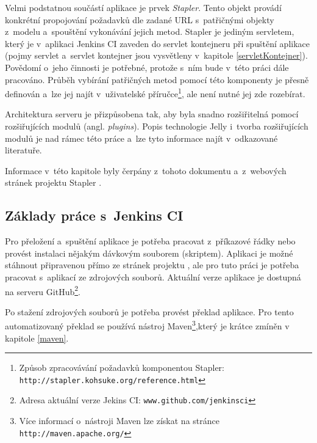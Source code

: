             Velmi podstatnou součástí aplikace je prvek \emph{Stapler}. Tento objekt
            provádí konkrétní propojování požadavků dle zadané URL s~patřičnými objekty
            z~modelu a~spouštění vykonávání jejich metod. Stapler je
            jediným servletem, který je v~aplikaci Jenkins CI zaveden do
            servlet kontejneru při spuštění aplikace (pojmy servlet a~servlet kontejner 
            jsou vysvětleny v~kapitole \ref{servletKontejner}).
            Povědomí o~jeho
            činnosti je potřebné, protože s~ním bude v~této práci dále pracováno.
            Průběh vybírání patřičných metod pomocí této komponenty je přesně
            definován a~lze jej najít v~uživatelské příručce\footnote{
                Způsob zpracovávání požadavků komponentou Stapler:
                \texttt{http://stapler.kohsuke.org/reference.html}}, 
                ale není nutné jej zde rozebírat.

            Architektura serveru je přizpůsobena tak, aby byla snadno rozšiřitelná
            pomocí rozšiřujících modulů (angl. \emph{plugins}). Popis technologie Jelly
            i~tvorba rozšiřujících modulů je nad rámec této práce a~lze tyto informace
            najít v~odkazované literatuře.
        
            Informace v~této kapitole byly čerpány z~tohoto dokumentu \cite{architectureOverview}
            a~z~webových stránek projektu Stapler \cite{staplerWeb}.

        \subsection{Základy práce s~Jenkins CI} \label{jenkinsUsage}
            Pro přeložení a~spuštění aplikace je potřeba pracovat z~příkazové řádky nebo provést instalaci nějakým dávkovým souborem (skriptem).
            Aplikaci je možné stáhnout připravenou přímo ze stránek projektu \cite{jenkinsWeb}, ale pro tuto práci je potřeba 
            pracovat s~aplikací ze zdrojových souborů. Aktuální verze aplikace je dostupná na serveru 
            GitHub\footnote{Adresa aktuální verze Jekins CI: \texttt{www.github.com/jenkinsci}}.

            Po stažení zdrojových souborů je potřeba provést překlad aplikace. Pro tento automatizovaný 
            překlad se používá nástroj Maven\footnote{Více informací o~nástroji Maven lze získat na stránce 
            \texttt{http://maven.apache.org/}},který je krátce zmíněn v kapitole \ref{maven}. 
            
